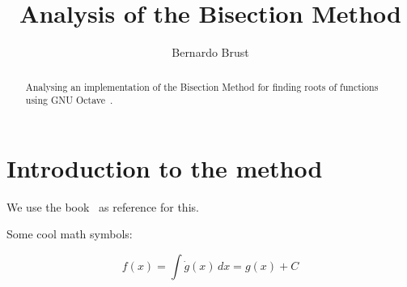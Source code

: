 \documentclass[12pt]{article}
\title{Analysis of the Bisection Method}
\author{Bernardo Brust}
\begin{document}
\maketitle

\begin{abstract}
  Analysing an implementation of the Bisection Method for finding roots of functions using GNU Octave~\cite{octave}.
\end{abstract}

\section{Introduction to the method}\label{sec:intro}

We use the book~\cite{book} as reference for this.

Some cool math symbols:

\begin{equation}
f(x) = \int \dot{g}(x)\,dx = g(x) + C
\end{equation}



\end{document}
